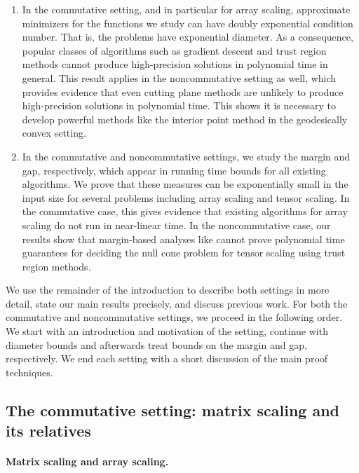 \begin{enumerate} 
\item[i)] In the commutative setting, and in particular for array scaling, approximate minimizers for the functions we study can have doubly exponential condition number. That is, the problems have exponential diameter. As a consequence, popular classes of algorithms such as gradient descent and trust region methods cannot produce high-precision solutions in polynomial time in general. This result applies in the noncommutative setting as well, which provides evidence that even cutting plane methods are unlikely to produce high-precision solutions in polynomial time. This shows it is necessary to develop powerful methods like the interior point method in the geodesically convex setting. 
\item[ii)] In the commutative and noncommutative settings, we study the margin and gap, respectively, which appear in running time bounds for all existing algorithms. We prove that these measures can be exponentially small in the input size for several problems including array scaling and tensor scaling. In the commutative case, this gives evidence that existing algorithms for array scaling do not run in near-linear time. In the noncommutative case, our results show that margin-based analyses like \cite{gradflow} cannot prove polynomial time guarantees for deciding the null cone problem for tensor scaling using trust region methods. 
\end{enumerate} 


We use the remainder of the introduction to describe both settings in more detail, state our main results precisely, and discuss previous work. For both the commutative and noncommutative settings, we proceed in the following order. We start with an introduction and motivation of the setting, continue with diameter bounds and afterwards treat bounds on the margin and gap, respectively. We end each setting with a short discussion of the main proof techniques.



\subsection{The commutative setting: matrix scaling and its relatives}


\paragraph{Matrix scaling and array scaling.}

